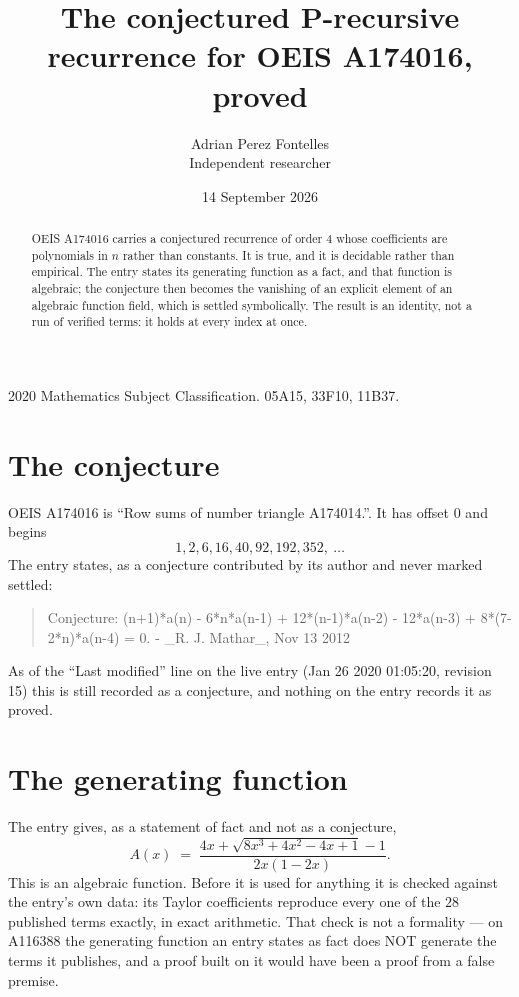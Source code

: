\documentclass[11pt,a4paper]{article}
\title{The conjectured P-recursive recurrence for OEIS A174016, proved}
\author{Adrian Perez Fontelles\\ \small Independent researcher}
\date{14 September 2026}
\theoremstyle{plain}
\theoremstyle{definition}
\begin{document}
\maketitle

\begin{abstract}
OEIS A174016 carries a conjectured recurrence of order $4$ whose coefficients are polynomials in
$n$ rather than constants. It is true, and it is decidable rather than empirical. The entry
states its generating function as a fact, and that function is algebraic; the conjecture then
becomes the vanishing of an explicit element of an algebraic function field, which is settled
symbolically. The result is an identity, not a run of verified terms: it holds at every index
at once.
\end{abstract}

\noindent\small 2020 Mathematics Subject Classification. 05A15, 33F10, 11B37.\normalsize

\section{The conjecture}

OEIS A174016 is ``Row sums of number triangle A174014.''. It has offset $0$ and begins
\[
1, 2, 6, 16, 40, 92, 192, 352,\ \dots
\]
The entry states, as a conjecture contributed by its author and never marked settled:
\begin{quote}\raggedright\small
Conjecture: (n+1)*a(n) - 6*n*a(n-1) + 12*(n-1)*a(n-2) - 12*a(n-3) + 8*(7-2*n)*a(n-4) = 0. - \_R. J. Mathar\_, Nov 13 2012
\end{quote}
As of the ``Last modified'' line on the live entry (Jan 26 2020 01:05:20, revision 15)
this is still recorded as a conjecture, and nothing on the entry records it as proved.

\section{The generating function}

The entry gives, as a statement of fact and not as a conjecture,
\[
A(x)\;=\;\frac{4 x + \sqrt{8 x^{3} + 4 x^{2} - 4 x + 1} - 1}{2 x \left(1 - 2 x\right)} .
\]
This is an algebraic function. Before it is used for anything it is checked against the entry's
own data: its Taylor coefficients reproduce every one of the $28$ published terms
exactly, in exact arithmetic. That check is not a formality --- on A116388 the generating
function an entry states as fact does NOT generate the terms it publishes, and a proof built on
it would have been a proof from a false premise.
\end{document}
